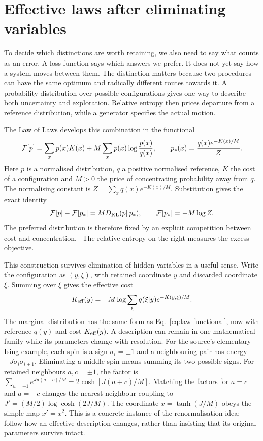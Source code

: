 \section{Effective laws after eliminating variables}
\label{section:loss-dynamics-and-the-choice-of-scale}

To decide which distinctions are worth retaining, we also need to say what counts as an error. A loss function says which answers we prefer. It does not yet say how a system moves between them. The distinction matters because two procedures can have the same optimum and radically different routes towards it. A probability distribution over possible configurations gives one way to describe both uncertainty and exploration. Relative entropy then prices departure from a reference distribution, while a generator specifies the actual motion.

The Law of Laws develops this combination in the functional
\begin{equation}
 {\cal F}[p]=\sum_x p(x)K(x)+M\sum_x p(x)\log\frac{p(x)}{q(x)},
 \qquad
 p_*(x)=\frac{q(x)e^{-K(x)/M}}{Z}.
 \label{eq:law-functional}
\end{equation}
Here $p$ is a normalised distribution, $q$ a positive normalised reference, $K$ the cost of a configuration and $M>0$ the price of concentrating probability away from $q$. The normalising constant is $Z=\sum_xq(x)e^{-K(x)/M}$. Substitution gives the exact identity
\[
 {\cal F}[p]-{\cal F}[p_*]=M D_{\rm KL}(p\Vert p_*),
 \qquad {\cal F}[p_*]=-M\log Z.
\]
The preferred distribution is therefore fixed by an explicit competition between cost and concentration.~\cite{Reference0e02fc} The relative entropy on the right measures the excess objective.

This construction survives elimination of hidden variables in a useful sense. Write the configuration as $(y,\xi)$, with retained coordinate $y$ and discarded coordinate $\xi$. Summing over $\xi$ gives the effective cost
\begin{equation}
 K_{\rm eff}(y)
 =-M\log\sum_\xi q(\xi|y)e^{-K(y,\xi)/M}.
 \label{eq:effective-law}
\end{equation}
The marginal distribution has the same form as Eq.~\eqref{eq:law-functional}, now with reference $q(y)$ and cost $K_{\rm eff}(y)$. A description can remain in one mathematical family while its parameters change with resolution. For the source's elementary Ising example, each spin is a sign $\sigma_i=\pm1$ and a neighbouring pair has energy $-J\sigma_i\sigma_{i+1}$. Eliminating a middle spin means summing its two possible signs. For retained neighbours $a,c=\pm1$, the factor is $\sum_{u=\pm1}e^{Ju(a+c)/M}=2\cosh[J(a+c)/M]$. Matching the factors for $a=c$ and $a=-c$ changes the nearest-neighbour coupling to $J'=(M/2)\log\cosh(2J/M)$. The coordinate $x=\tanh(J/M)$ obeys the simple map $x'=x^2$. This is a concrete instance of the renormalisation idea: follow how an effective description changes, rather than insisting that its original parameters survive intact.

